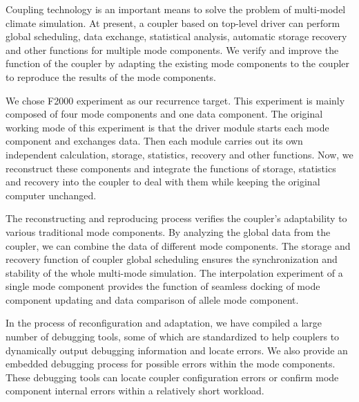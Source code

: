 
\begin{eabstract}

Coupling technology is an important means to solve the problem of multi-model climate simulation. At present, a coupler based on top-level driver can perform global scheduling, data exchange, statistical analysis, automatic storage recovery and other functions for multiple mode components. We verify and improve the function of the coupler by adapting the existing mode components to the coupler to reproduce the results of the mode components.

We chose F2000 experiment as our recurrence target. This experiment is mainly composed of four mode components and one data component. The original working mode of this experiment is that the driver module starts each mode component and exchanges data. Then each module carries out its own independent calculation, storage, statistics, recovery and other functions. Now, we reconstruct these components and integrate the functions of storage, statistics and recovery into the coupler to deal with them while keeping the original computer unchanged.

The reconstructing and reproducing process verifies the coupler's adaptability to various traditional mode components. By analyzing the global data from the coupler, we can combine the data of different mode components. The storage and recovery function of coupler global scheduling ensures the synchronization and stability of the whole multi-mode simulation. The interpolation experiment of a single mode component provides the function of seamless docking of mode component updating and data comparison of allele mode component.

In the process of reconfiguration and adaptation, we have compiled a large number of debugging tools, some of which are standardized to help couplers to dynamically output debugging information and locate errors. We also provide an embedded debugging process for possible errors within the mode components. These debugging tools can locate coupler configuration errors or confirm mode component internal errors within a relatively short workload.

\end{eabstract}

